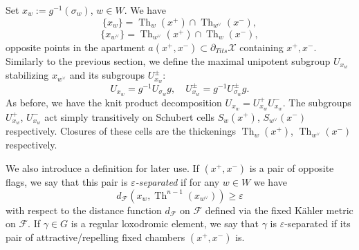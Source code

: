 \documentclass[12pt]{amsbook}%
\newtheorem{lem}[thm]{Lemma}
\theoremstyle{definition}
\theoremstyle{remark}
\numberwithin{section}{chapter}
\numberwithin{subsection}{section}
\numberwithin{figure}{chapter}
\DeclareMathOperator{\Th}{Th}
\DeclareMathOperator{\Opp}{Opp}
\def\tits{\partial_{Tits}}
\def\cF{{\mathscr{F}}}
\def\cX{{\mathscr{X}}}
\def\mini{\scriptsize}
\def\kap{}
\begin{document}
{{Set $x_w:= g^{-1}(\sigma_w)$, $w\in W$. We have 
$$
\{x_w\}=\Th_{w}(x^+)\cap \Th_{w^\vee}(x^-),$$ 
$$
\{x_{w^\vee}\}=\Th_{w^\vee}(x^+)\cap \Th_{w}(x^-),$$ 
opposite points in the apartment $a(x^+,x^-)\subset \tits \cX$ containing $x^+, x^-$. 
Similarly to the previous section, we define the maximal unipotent subgroup $U_{x_w}$ 
stabilizing $x_{w^\vee}$ and its subgroups $U_{x_w}^\pm$:
$$
U_{x_w}= g^{-1} U_{\sigma_w} g, \quad U_{x_w}^\pm= g^{-1} U^\pm_{\sigma_w} g. 
$$
As before, we have the knit product decomposition  $U_{x_w}=U_{x_w}^+ U^-_{x_w}$. The 
subgroups $U_{x_w}^+$, $U_{x_w}^-$ act simply transitively on Schubert cells $S_w(x^+)$, $S_{w^\vee}(x^-)$ respectively. Closures of these cells are the thickenings 
$\Th_{w}(x^+)$, $\Th_{w^\vee}(x^-)$ respectively. 

\medskip 
We also introduce a definition for later use. If $(x^+,x^-)$ is a pair of opposite flags, we say that this 
pair is \emph{$\varepsilon$-separated} if for any $w\in W$ we have 
\begin{equation}\label{e_separation_inequality}
d_{\cF}(x_w,\Th^{n-1}(x_{w^\vee}))\geqslant \varepsilon
\end{equation} 
with respect to the distance function $d_{\cF}$ on $\cF$ defined via the fixed K\"ahler metric on $\cF$. 
If $\gamma\in G$ is a regular loxodromic element, we say that $\gamma$ is $\varepsilon$-separated 
if its pair of attractive/repelling fixed chambers $(x^+,x^-)$ is.




}}
\end{document}
